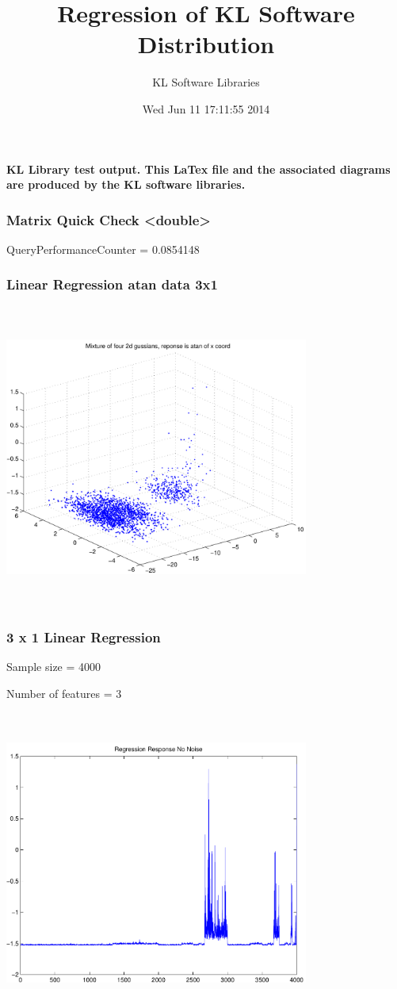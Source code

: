 \documentclass[9pt]{article}
\theoremstyle{plain}
\theoremstyle{definition}
\theoremstyle{remark}
\numberwithin{equation}{section}
\begin{document}
\title{Regression of KL Software Distribution   }
\author{KL Software Libraries}
\date{Wed Jun 11 17:11:55 2014
}
\maketitle
\textbf{ KL Library test output.  This LaTex file and the associated diagrams are produced by the KL software libraries.}
\subsubsection{Matrix Quick Check <double>}
QueryPerformanceCounter  =  0.0854148
\subsubsection{Linear Regression atan data 3x1}
\includegraphics[width=10.0cm,height=10.0cm]{AtanDataSet.pdf}

\subsubsection{3 x 1 Linear Regression}
Sample size = 4000

Number of features = 3

\includegraphics[width=10.0cm,height=10.0cm]{AtanDataSet_regression_response_no_noise.pdf}
\end{document}
